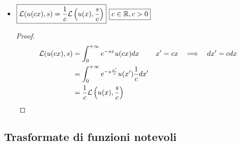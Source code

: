 \begin{itemize}
\begin{proof}
\begin{equation*}
\Lc\left(e^{s_{0} x} u(x), s\right) = \int^{+ \infty}_{0} e^{- x(s - s_{0})} u(x) dx = \Lc(u(x), s - s_{0})
\end{equation*}
\end{proof}
\item $\boxed{\mathcal{L}(u(cx), s) = \frac{1}{c}\mathcal{L}\left(u(x), \frac{s}{c}\right)}$ $\boxed{c\in \mathbb{R}, c > 0}$

\begin{proof}
\begin{equation*}
\begin{aligned}
\mathcal{L}(u(cx), s) & = \int^{+ \infty}_{0} e^{- sx} u(cx) dx & x'= cx\ \ \implies \ \ dx'= cdx\\
 & = \int^{+ \infty}_{0} e^{- s\frac{x'}{c}} u(x')\frac{1}{c} dx' & \\
 & = \frac{1}{c}\mathcal{L}\left(u(x), \frac{s}{c}\right) &
\end{aligned}
\end{equation*}
\end{proof}
\end{itemize}

\subsection{Trasformate di funzioni notevoli}

